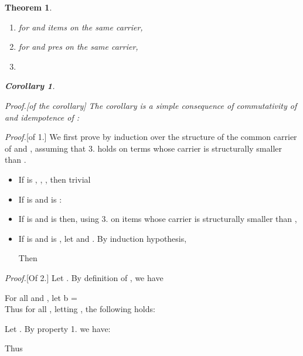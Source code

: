 \documentclass[preprint]{sigplanconf}
\newcommand{\false}{\mathit{false}}
\newcounter{item}
\newtheorem{theorem}[item]{Theorem}
\newtheorem{corollary}[item]{Corollary}
\newenvironment{proof}{\begin{trivlist}\item[]{\em Proof.}}{\end{trivlist}}
\begin{document}
\begin{theorem}~

\begin{enumerate}
\item for  and  items on the same carrier,

\item for  and  pres on the same carrier,

\item

\end{enumerate}
\begin{corollary}

\end{corollary}
\begin{proof}[of the corollary]
The corollary is a simple consequence of commutativity of  and
idempotence of :


\end{proof}
\end{theorem}
\begin{proof}[of 1.]
We first prove  by
induction over the structure of the common carrier of  and , assuming
that 3. holds on terms whose carrier is structurally smaller than .

\begin{itemize}
\item If  is , , ,  then trivial
\item If  is  and  is :

\item If  is  and  is  then, using 3.
on items whose carrier is structurally smaller than ,

\item If  is  and  is ,
let  and
. By induction hypothesis,

Then\\

\end{itemize}
\end{proof}
\begin{proof}[Of 2.]
Let .
By definition of , we have

For all  and , let b = \false\\
Thus for all , letting
, the following holds:

Let . By property 1. we have: 

Thus

\end{proof}
\end{document}
